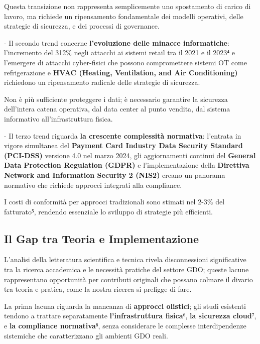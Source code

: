 \documentclass{report}
\begin{document}
Questa transizione non rappresenta semplicemente uno spostamento di
carico di lavoro, ma richiede un ripensamento fondamentale dei modelli
operativi, delle strategie di sicurezza, e dei processi di governance.

- Il secondo trend concerne \textbf{l'evoluzione delle minacce
informatiche}: l'incremento del 312\% negli attacchi ai sistemi retail
tra il 2021 e il 2023⁴ e l'emergere di attacchi cyber-fisici che possono
compromettere sistemi OT come refrigerazione e \textbf{HVAC (Heating,
Ventilation, and Air Conditioning)} richiedono un ripensamento radicale
delle strategie di sicurezza.

Non è più sufficiente proteggere i dati; è necessario garantire la
sicurezza dell'intera catena operativa, dal data center al punto
vendita, dal sistema informativo all'infrastruttura fisica.

- Il terzo trend riguarda \textbf{la crescente complessità normativa}:
l'entrata in vigore simultanea del \textbf{Payment Card Industry Data
Security Standard (PCI-DSS)} versione 4.0 nel marzo 2024, gli
aggiornamenti continui del \textbf{General Data Protection Regulation
(GDPR)} e l'implementazione della \textbf{Direttiva Network and
Information Security 2 (NIS2)} creano un panorama normativo che richiede
approcci integrati alla compliance.

I costi di conformità per approcci tradizionali sono stimati nel 2-3\%
del fatturato⁵, rendendo essenziale lo sviluppo di strategie più
efficienti.

\subsection{\texorpdfstring{\textbf{Il Gap tra Teoria e
Implementazione}}{1.1.3 Il Gap tra Teoria e Implementazione}}\label{il-gap-tra-teoria-e-implementazione}

L'analisi della letteratura scientifica e tecnica rivela disconnessioni
significative tra la ricerca accademica e le necessità pratiche del
settore GDO; queste lacune rappresentano opportunità per contributi
originali che possano colmare il divario tra teoria e pratica, come la nostra ricerca si prefigge di fare.

La prima lacuna riguarda la mancanza di \textbf{approcci olistici}; gli studi
esistenti tendono a trattare separatamente \textbf{l'infrastruttura fisica}⁶, \textbf{la
sicurezza cloud}⁷, e \textbf{la compliance normativa}⁸, senza considerare le
complesse interdipendenze sistemiche che caratterizzano gli ambienti GDO
reali.
\end{document}
